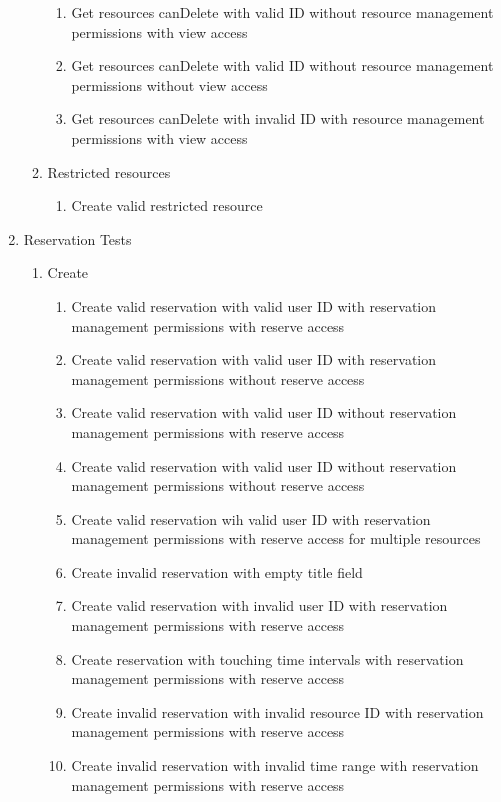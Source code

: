 \documentclass[12pt]{article}
\begin{document}
\begin{enumerate}
\begin{enumerate}
\begin{enumerate}
            \item Get resources canDelete with valid ID without resource management permissions with view access
            \item Get resources canDelete with valid ID without resource management permissions without view access
            \item Get resources canDelete with invalid ID with resource management permissions with view access
            \end{enumerate}
        \item Restricted resources
        \begin{enumerate}
            \item Create valid restricted resource
        \end{enumerate}
    \end{enumerate}
    \item Reservation Tests
    \begin{enumerate}
        \item Create
        \begin{enumerate}
            \item Create valid reservation with valid user ID with reservation management permissions with reserve access
            \item Create valid reservation with valid user ID with reservation management permissions without reserve access
            \item Create valid reservation with valid user ID without reservation management permissions with reserve access
            \item Create valid reservation with valid user ID without reservation management permissions without reserve access
            \item Create valid reservation wih valid user ID with reservation management permissions with reserve access for multiple resources
            \item Create invalid reservation with empty title field
            \item Create valid reservation with invalid user ID with reservation management permissions with reserve access
            \item Create reservation with touching time intervals with reservation management permissions with reserve access
            \item Create invalid reservation with invalid resource ID with reservation management permissions with reserve access
            \item Create invalid reservation with invalid time range with reservation management permissions with reserve access    

\end{enumerate}
\end{enumerate}
\end{enumerate}
\end{document}
